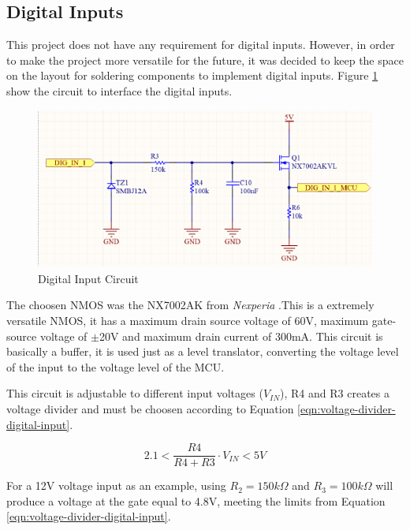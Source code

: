 	\subsection{Digital Inputs}\label{ssec:digital-inputs}

		This project does not have any requirement for digital inputs. However, in order to make the project more versatile for the future, it was decided to keep the space on the layout for soldering components to implement digital inputs. Figure \ref{fig:digital-input-circuit} show the circuit to interface the digital inputs.

			\begin{figure}[htbp]
				\centering
				\includegraphics[scale=1]{figuras/fig-digital-input-circuit.png}
				\caption{Digital Input Circuit \cite{digital-input-circuit}}
				\label{fig:digital-input-circuit}
			\end{figure}

		The choosen NMOS was the NX7002AK from \textit{Nexperia} \cite{nx7002ak-datasheet}.This is a extremely versatile NMOS, it has a maximum drain source voltage of 60V, maximum gate-source voltage of $\pm$20V and maximum drain current of 300mA. This circuit is basically a buffer, it is used just as a level translator, converting the voltage level of the input to the voltage level of the MCU. 

		This circuit is adjustable to different input voltages ($V_{IN}$), R4 and R3 creates a voltage divider and must be choosen according to Equation \ref{eqn:voltage-divider-digital-input}.

		\begin{equation}\label{eqn:voltage-divider-digital-input}
			2.1 < \frac{R4}{R4 + R3} \cdot V_{IN} < 5V
		\end{equation}

		For a 12V voltage input as an example, using $R_{2}=150k\Omega$ and $R_{3}=100k\Omega$ will produce a voltage at the gate equal to 4.8V, meeting the limits from Equation \ref{eqn:voltage-divider-digital-input}.

